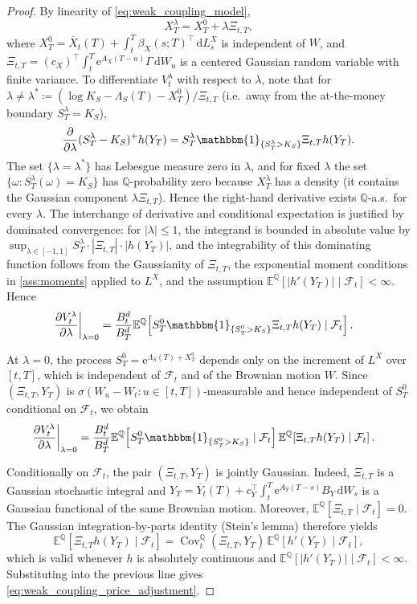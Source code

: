 \documentclass[10pt,a4paper,reqno]{amsart}
\newcommand{\E}{\mathbb{E}}
\newcommand{\Q}{\mathbb{Q}}
\newcommand{\F}{\mathcal{F}}
\newcommand{\1}{\mathbbm{1}}
\newcommand{\dd}{\mathrm{d}}
\newcommand{\ee}{\mathrm{e}}
\DeclareMathOperator{\Cov}{Cov}
\begin{document}
\begin{proof}
By linearity of \eqref{eq:weak_coupling_model},
\[
X_T^\lambda = X_T^0 + \lambda \Xi_{t,T},
\]
where \(X_T^0 = \overline{X}_t(T) + \int_t^T \beta_X(s;T)^\top\,\dd
L_s^X\) is independent of \(W\), and \(\Xi_{t,T} = (c_X)^\top\int_t^T
\ee^{A_X(T-u)}\Gamma\,\dd W_u\) is a centered Gaussian random variable with
finite variance. To differentiate \(V_t^\lambda\) with respect to
\(\lambda\), note that for \(\lambda \neq \lambda^* \coloneqq
(\log K_S - \Lambda_S(T) - X_T^0)/\Xi_{t,T}\) (i.e.\ away from the
at-the-money boundary \(S_T^\lambda = K_S\)),
\[
\frac{\partial}{\partial\lambda}(S_T^\lambda - K_S)^+ h(Y_T)
= S_T^\lambda \1_{\{S_T^\lambda>K_S\}} \Xi_{t,T} h(Y_T).
\]
The set \(\{\lambda = \lambda^*\}\) has Lebesgue measure zero in \(\lambda\),
and for fixed \(\lambda\) the set \(\{\omega: S_T^\lambda(\omega) = K_S\}\)
has \(\Q\)-probability zero because \(X_T^\lambda\) has a density
(it contains the Gaussian component \(\lambda\Xi_{t,T}\)). Hence the
right-hand derivative exists \(\Q\)-a.s.\ for every \(\lambda\).
The interchange of derivative and conditional expectation is justified by
dominated convergence: for \(|\lambda| \le 1\), the integrand is bounded in
absolute value by
\(\sup_{\lambda\in[-1,1]}S_T^\lambda\cdot|\Xi_{t,T}|\cdot|h(Y_T)|\), and the
integrability of this dominating function follows from the Gaussianity of
\(\Xi_{t,T}\), the exponential moment conditions in
\ref{ass:moments} applied to \(L^X\), and the
assumption \(\E^\Q[|h'(Y_T)|\mid\F_t]<\infty\).
Hence
\begin{align*}
  \left.\frac{\partial V_t^\lambda}{\partial \lambda}\right|_{\lambda=0}
  &= \frac{B_t^d}{B_T^d}
     \E^\Q\!\left[
       S_T^0 \1_{\{S_T^0>K_S\}} \Xi_{t,T} h(Y_T)
       \mid \F_t
     \right].
\end{align*}

At \(\lambda=0\), the process \(S_T^0 = \ee^{\Lambda_S(T)+X_T^0}\) depends
only on the increment of \(L^X\) over \([t,T]\), which is independent of
\(\F_t\) and of the Brownian motion \(W\). Since \((\Xi_{t,T},Y_T)\) is
\(\sigma(W_u-W_t : u \in [t,T])\)-measurable and hence independent of
\(S_T^0\) conditional on \(\F_t\), we obtain
\begin{align*}
  \left.\frac{\partial V_t^\lambda}{\partial \lambda}\right|_{\lambda=0}
  &= \frac{B_t^d}{B_T^d}
     \E^\Q\!\left[S_T^0 \1_{\{S_T^0>K_S\}}\mid\F_t\right]
     \E^\Q\!\left[\Xi_{t,T} h(Y_T)\mid\F_t\right].
\end{align*}

Conditionally on \(\F_t\), the pair \((\Xi_{t,T},Y_T)\) is jointly Gaussian.
Indeed, \(\Xi_{t,T}\) is a Gaussian stochastic integral and \(Y_T =
\overline{Y}_t(T) + c_Y^\top\int_t^T \ee^{A_Y(T-s)} B_Y\,\dd W_s\) is a
Gaussian functional of the same Brownian motion. Moreover,
\(\E^\Q[\Xi_{t,T}\mid\F_t]=0\). The Gaussian integration-by-parts identity
(Stein's lemma) therefore yields
\[
\E^\Q\!\left[\Xi_{t,T} h(Y_T)\mid\F_t\right]
= \Cov_t^\Q(\Xi_{t,T},Y_T)\,
   \E^\Q\!\left[h'(Y_T)\mid\F_t\right],
\]
which is valid whenever \(h\) is absolutely continuous and
\(\E^\Q[|h'(Y_T)|\mid\F_t]<\infty\). Substituting into the previous line
gives \eqref{eq:weak_coupling_price_adjustment}.
\end{proof}
\end{document}
